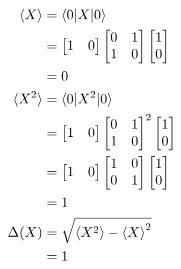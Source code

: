 \documentclass{article}
\begin{document}
\begin{align*}
  \braket{X}   & = \braket{0 | X | 0}                           \\
               & = \begin{bmatrix}
                     1 & 0
                   \end{bmatrix} \begin{bmatrix}
                                   0 & 1 \\
                                   1 & 0
                                 \end{bmatrix} \begin{bmatrix}
                                                 1 \\
                                                 0
                                               \end{bmatrix}   \\
               & = 0                                            \\
  \braket{X^2} & = \braket{0 | X^2 | 0}                         \\
               & = \begin{bmatrix}
                     1 & 0
                   \end{bmatrix} \begin{bmatrix}
                                   0 & 1 \\
                                   1 & 0
                                 \end{bmatrix}^2 \begin{bmatrix}
                                                   1 \\
                                                   0
                                                 \end{bmatrix} \\
               & = \begin{bmatrix}
                     1 & 0
                   \end{bmatrix} \begin{bmatrix}
                                   1 & 0 \\
                                   0 & 1
                                 \end{bmatrix} \begin{bmatrix}
                                                 1 \\
                                                 0
                                               \end{bmatrix}   \\
               & = 1                                            \\
  \Delta(X)    & = \sqrt{\braket{X^2} - \braket{X}^2}           \\
               & = 1
\end{align*}
\end{document}
